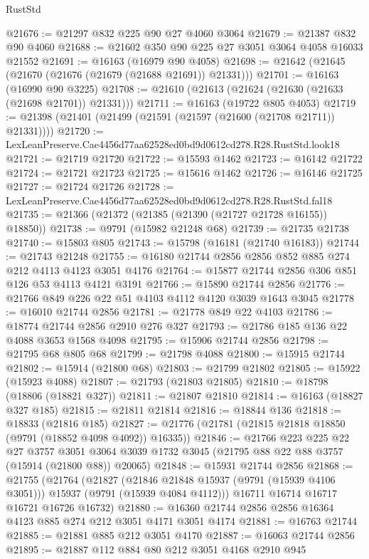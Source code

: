 \begin{lexlean}{RustStd}
\begin{coremodule}
@21676 := @21297 @832 @225 @90 @27 @4060 @3064
@21679 := @21387 @832 @90 @4060
@21688 := @21602 @350 @90 @225 @27 @3051 @3064 @4058 @16033 @21552
@21691 := @16163 (@16979 @90 @4058)
@21698 := @21642 (@21645 (@21670 (@21676 (@21679 (@21688 @21691)) @21331)))
@21701 := @16163 (@16990 @90 @3225)
@21708 := @21610 (@21613 (@21624 (@21630 (@21633 (@21698 @21701)) @21331)))
@21711 := @16163 (@19722 @805 @4053)
@21719 := @21398 (@21401 (@21499 (@21591 (@21597 (@21600 (@21708 @21711)) @21331))))
@21720 := LexLeanPreserve.Cae4456d77aa62528ed0bd9d0612cd278.R28.RustStd.look18
@21721 := @21719 @21720
@21722 := @15593 @1462
@21723 := @16142 @21722
@21724 := @21721 @21723
@21725 := @15616 @1462
@21726 := @16146 @21725
@21727 := @21724 @21726
@21728 := LexLeanPreserve.Cae4456d77aa62528ed0bd9d0612cd278.R28.RustStd.fal18
@21735 := @21366 (@21372 (@21385 (@21390 (@21727 @21728 @16155)) @18850))
@21738 := @9791 (@15982 @21248 @68)
@21739 := @21735 @21738
@21740 := @15803 @805
@21743 := @15798 (@16181 (@21740 @16183))
@21744 := @21743 @21248
@21755 := @16180 @21744 @2856 @2856 @852 @885 @274 @212 @4113 @4123 @3051 @4176
@21764 := @15877 @21744 @2856 @306 @851 @126 @53 @4113 @4121 @3191
@21766 := @15890 @21744 @2856
@21776 := @21766 @849 @226 @22 @51 @4103 @4112 @4120 @3039 @1643 @3045
@21778 := @16010 @21744 @2856
@21781 := @21778 @849 @22 @4103
@21786 := @18774 @21744 @2856 @2910 @276 @327
@21793 := @21786 @185 @136 @22 @4088 @3653 @1568 @4098
@21795 := @15906 @21744 @2856
@21798 := @21795 @68 @805 @68
@21799 := @21798 @4088
@21800 := @15915 @21744
@21802 := @15914 (@21800 @68)
@21803 := @21799 @21802
@21805 := @15922 (@15923 @4088)
@21807 := @21793 (@21803 @21805)
@21810 := @18798 (@18806 (@18821 @327))
@21811 := @21807 @21810
@21814 := @16163 (@18827 @327 @185)
@21815 := @21811 @21814
@21816 := @18844 @136
@21818 := @18833 (@21816 @185)
@21827 := @21776 (@21781 (@21815 @21818 @18850 (@9791 (@18852 @4098 @4092)) @16335))
@21846 := @21766
    @223
    @225
    @22
    @27
    @3757
    @3051
    @3064
    @3039
    @1732
    @3045
    (@21795 @88 @22 @88 @3757 (@15914 (@21800 @88)) @20065)
@21848 := @15931 @21744 @2856
@21868 := @21755
    (@21764
      (@21827
        (@21846 @21848 @15937 (@9791 (@15939 @4106 @3051)))
        @15937
        (@9791 (@15939 @4084 @4112)))
      @16711
      @16714
      @16717
      @16721
      @16726
      @16732)
@21880 := @16360 @21744 @2856 @2856 @16364 @4123 @885 @274 @212 @3051 @4171 @3051 @4174
@21881 := @16763 @21744
@21885 := @21881 @885 @212 @3051 @4170
@21887 := @16063 @21744 @2856
@21895 := @21887 @112 @884 @80 @212 @3051 @4168 @2910 @945

\end{coremodule}
\end{lexlean}
